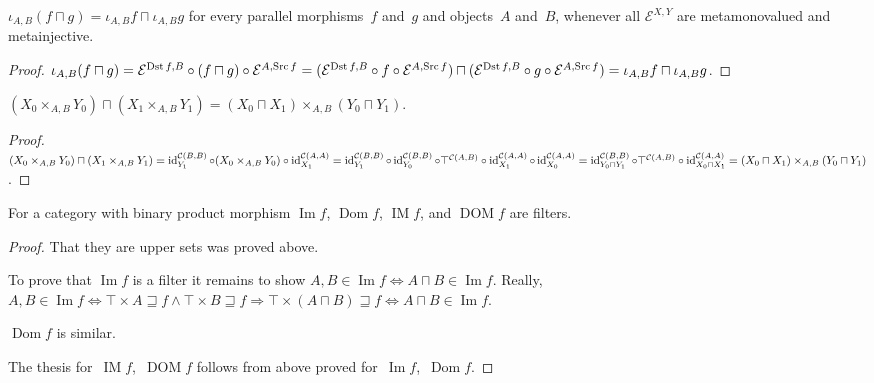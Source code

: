 \begin{prop}
$\iota_{A,B}(f\sqcap g)=\iota_{A,B}f\sqcap\iota_{A,B}g$
for every parallel morphisms~$f$ and~$g$ and objects~$A$
and~$B$, whenever all $\mathcal{E}^{X,Y}$ are metamonovalued
and metainjective.
\end{prop}

\begin{proof}
$\iota_{A,B}(f\sqcap g)=
\mathcal{E}^{\operatorname{Dst} f,B}\circ(f\sqcap g)\circ
\mathcal{E}^{A,\operatorname{Src} f}=
(\mathcal{E}^{\operatorname{Dst} f,B}\circ f\circ\mathcal{E}^{A,\operatorname{Src} f})\sqcap
(\mathcal{E}^{\operatorname{Dst} f,B}\circ g\circ\mathcal{E}^{A,\operatorname{Src} f})=
\iota_{A,B}f\sqcap\iota_{A,B}g$.
\end{proof}

\begin{prop}
$(X_0\times_{A,B}Y_0)\sqcap(X_1\times_{A,B}Y_1)=
(X_0\sqcap X_1)\times_{A,B}(Y_0\sqcap Y_1)$.
\end{prop}

\begin{proof}
$(X_0\times_{A,B}Y_0)\sqcap(X_1\times_{A,B}Y_1)=
\operatorname{id}^{\mathcal{C}(B,B)}_{Y_1}\circ(X_0\times_{A,B}Y_0)\circ
\operatorname{id}^{\mathcal{C}(A,A)}_{X_1}=
\operatorname{id}^{\mathcal{C}(B,B)}_{Y_1}\circ
\operatorname{id}^{\mathcal{C}(B,B)}_{Y_0}\circ
\top^{\mathcal{C}(A,B)}\circ
\operatorname{id}^{\mathcal{C}(A,A)}_{X_1}\circ
\operatorname{id}^{\mathcal{C}(A,A)}_{X_0}=
\operatorname{id}^{\mathcal{C}(B,B)}_{Y_0\sqcap Y_1}\circ
\top^{\mathcal{C}(A,B)}\circ
\operatorname{id}^{\mathcal{C}(A,A)}_{X_0\sqcap X_1}=
(X_0\sqcap X_1)\times_{A,B}(Y_0\sqcap Y_1)$.
\end{proof}

\begin{prop}
For a category with binary product morphism
$\operatorname{Im}f$, $\operatorname{Dom}f$,
$\operatorname{IM}f$, and $\operatorname{DOM}f$
are filters.
\end{prop}

\begin{proof}
That they are upper sets was proved above.

To prove that $\operatorname{Im} f$ is a filter it remains
to show $A, B \in \operatorname{Im} f \Leftrightarrow
A \sqcap B \in \operatorname{Im} f$. Really,
$A, B \in \operatorname{Im} f \Leftrightarrow \top \times A \sqsupseteq f \land \top
\times B \sqsupseteq f \Rightarrow \top \times (A \sqcap B) \sqsupseteq f
\Leftrightarrow A \sqcap B \in \operatorname{Im} f$.

$\operatorname{Dom} f$ is similar.

The thesis for~$\operatorname{IM}f$,~$\operatorname{DOM}f$
follows from above proved
for~$\operatorname{Im}f$,~$\operatorname{Dom}f$.
\end{proof}


